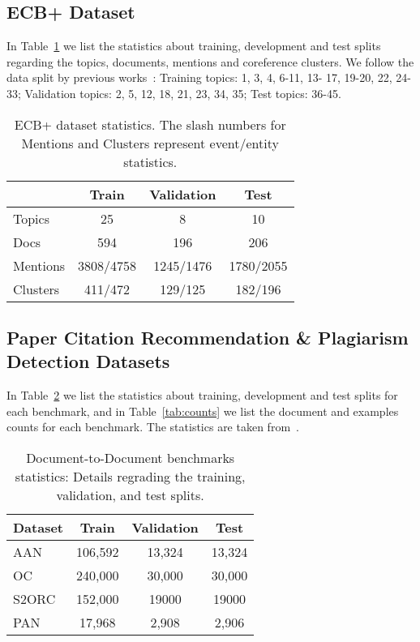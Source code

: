 \documentclass[11pt,a4paper]{article}
\begin{document}
\subsection{ECB+ Dataset}
\label{subsec:ecb_data}
In Table~\ref{tab:ecb_stat} we list the statistics about training, development and test splits regarding the topics, documents, mentions and coreference clusters. We follow the data split by previous works~\cite{cybulska2015bag, kenyon-dean-etal-2018-resolving,barhom-etal-2019-revisiting}: Training topics: 1, 3, 4, 6-11, 13- 17, 19-20, 22, 24-33; Validation topics: 2, 5, 12, 18, 21, 23, 34, 35; Test topics: 36-45.
\begin{table}[!hbt]
    \centering
        \small
    \begin{tabular}{@{}lccc@{}}
    \toprule
    & Train & Validation & Test \\
    \midrule
    Topics & 25 & 8 & 10 \\
    Docs & 594 & 196 & 206 \\
    Mentions & 3808/4758 & 1245/1476 & 1780/2055 \\
    Clusters & 411/472 & 129/125 & 182/196 \\
    \bottomrule
    \end{tabular}
    \caption{ECB+ dataset statistics. The slash numbers for Mentions and Clusters represent event/entity statistics.}
    \label{tab:ecb_stat}
\end{table} 
\subsection{Paper Citation Recommendation \& Plagiarism Detection Datasets}
\label{subsec:cda_data}
In Table~\ref{tab:splits} we list the statistics about training, development and test splits for each benchmark, and in Table~\ref{tab:counts} we list the document and examples counts for each benchmark. The statistics are taken from~\citet{zhou-etal-2020-multilevel}.
\begin{table}[htp]
\centering
    \small
  \def\arraystretch{1.2}\tabcolsep=7.5pt    
\begin{tabular}{lccc}
\toprule
  Dataset  & Train& Validation & Test \\
  \toprule
AAN         & 106,592 & 13,324   & 13,324  \\ 
OC          & 240,000 & 30,000  & 30,000 \\ 
S2ORC       & 152,000   & 19000   & 19000  \\
PAN         & 17,968 & 2,908 & 2,906 \\
\toprule
\end{tabular}
\caption{Document-to-Document benchmarks statistics: Details regrading the training, validation, and test splits.} 
\label{tab:splits}
\end{table}
\end{document}
